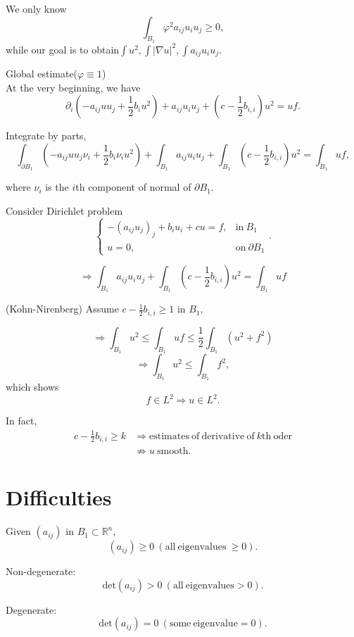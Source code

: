 \documentclass[12pt]{article}
\begin{document}
We only know
\[ \int_{B_1} \varphi^2 a_{ij}u_iu_j \ge 0, \]
while our goal is to obtain$\int u^2, \int |\nabla u|^2, \int a_{ij}u_iu_j$.

Global estimate($\varphi \equiv 1$)\\
At the very beginning, we have
\[ \partial_i\left( -a_{ij}uu_j + \frac{1}{2}b_iu^2 \right) + a_{ij}u_iu_j + \left( c - \frac{1}{2}b_{i, i} \right) u^2 = uf. \]

Integrate by parts,
\[ \int_{\partial B_1} \left( -a_{ij}uu_j\nu_i + \frac{1}{2}b_i\nu_iu^2 \right) + \int_{B_1}a_{ij}u_iu_j + \int_{B_1}\left( c-\frac{1}{2}b_{i, i} \right)u^2 = \int_{B_1}uf, \]

where $\nu_i$ is the $i$th component of normal of $\partial B_1$.

Consider Dirichlet problem
\begin{equation*}
\begin{cases}
	-(a_{ij}u_j)_j + b_iu_i + cu = f, &\mathrm{in}\ B_1\\
	u=0, &\mathrm{on}\ \partial B_1
\end{cases}
.
\end{equation*}

\[ \Rightarrow \int_{B_1} a_{ij}u_iu_j + \int_{B_1}\left( c - \frac{1}{2}b_{i, i} \right)u^2 = \int_{B_1} uf \]

(Kohn-Nirenberg) Assume $c-\frac{1}{2}b_{i, i} \ge 1$ in $B_1$,

\[\Rightarrow \int_{B_1} u^2 \le \int_{B_1} uf \le \frac{1}{2}\int_{B_1} \left(u^2 + f^2\right) \]
\[\Rightarrow \int_{B_1} u^2 \le \int_{B_1} f^2 ,\]
which shows
\[f\in L^2 \Rightarrow u\in L^2.\]

In fact, 
\begin{align*}
c-\frac{1}{2}b_{i, i}\ge k&\Rightarrow \mathrm{estimates\ of\ derivative\ of\ } k\mathrm{th\ oder}\\
&\not\Rightarrow u \mathrm{\ smooth}.
\end{align*}

\newpage
\section{Difficulties}
Given $(a_{ij})$ in $B_1 \subset \mathbb{R}^n$, 
\[(a_{ij})\ge0\ (\mathrm{all\ eigenvalues\ } \ge 0).\]

Non-degenerate: 
\[\mathrm{det}(a_{ij})>0\ (\mathrm{all\ eigenvalues} > 0).\]

Degenerate: 
\[\mathrm{det}(a_{ij})=0\ (\mathrm{some\ eigenvalue} = 0).\]
\end{document}
